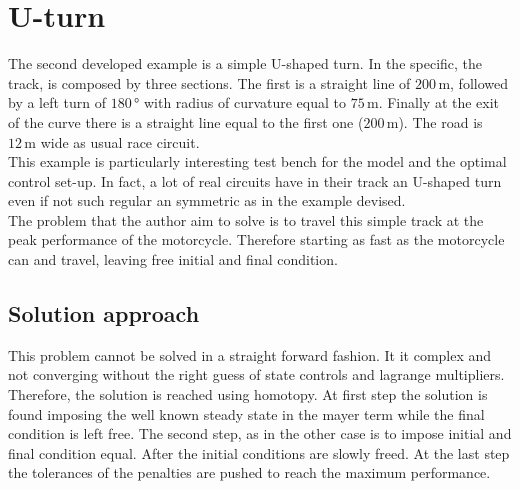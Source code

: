 \section{U-turn}
%
The second developed example is a simple U-shaped turn. In the specific, the track, is composed by three sections. The first is a straight line of $200\,\si{\metre}$, followed by a left turn of $180\,\si{\degree}$ with radius of curvature equal to $75\,\si{\metre}$. Finally at the exit of the curve there is a straight line equal to the first one ($200\,\si{\metre}$). The road is $12\,\si{\metre}$ wide as usual race circuit.\\
This example is particularly interesting test bench for the model and the optimal control set-up. In fact, a lot of real circuits have in their track an U-shaped turn even if not such regular an symmetric as in the example devised.\\
The problem that the author aim to solve is to travel this simple track at the peak performance of the motorcycle. Therefore starting as fast as the motorcycle can and travel, leaving free initial and final condition.
%
\subsection{Solution approach}
%
This problem cannot be solved in a straight forward fashion. It it complex and not converging without the right guess of state controls and lagrange multipliers.\\
Therefore, the solution is reached using homotopy. At first step the solution is found imposing the well known steady state in the mayer term while the final condition is left free. The second step, as in the other case is to impose initial and final condition equal. After the initial conditions are slowly freed. At the last step the tolerances of the penalties are pushed to reach the maximum performance.
%
